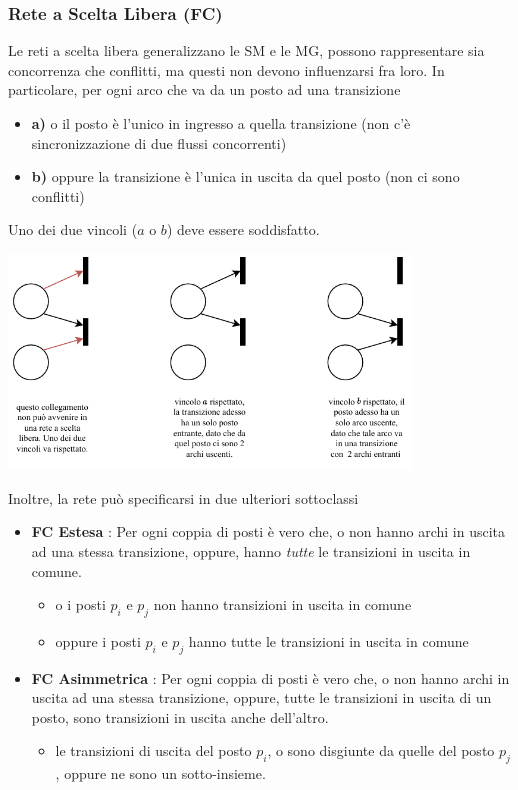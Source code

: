 \documentclass[10pt, letterpaper]{report}
\begin{document}
\subsubsection{Rete a Scelta Libera (FC)}
Le reti a scelta libera generalizzano le SM e le MG, possono rappresentare sia concorrenza che conflitti, ma questi non devono influenzarsi fra loro. In particolare, per ogni arco che va da un posto ad una transizione\begin{itemize}
    \item \textbf{a)} o il posto è l'unico in ingresso a quella transizione (non c'è sincronizzazione di due flussi concorrenti)
    \item \textbf{b)} oppure la transizione è l'unica in uscita da quel posto (non ci sono conflitti)
\end{itemize}
Uno dei due vincoli ($a$ o $b$) deve essere soddisfatto.
\begin{center}
    \includegraphics[width=0.8\textwidth]{images/FreeChoice.drawio.pdf}
\end{center}
Inoltre, la rete può specificarsi in due ulteriori sottoclassi\begin{itemize}
    \item \textbf{FC Estesa} : Per ogni coppia di posti è vero che, o non hanno archi in uscita ad una stessa transizione, oppure, hanno \textit{tutte} le transizioni in uscita in comune.\begin{itemize}
        \item o i posti $p_i$ e $p_j$ non hanno transizioni in uscita in comune 
        \item oppure i posti $p_i$ e $p_j$ hanno tutte le transizioni in uscita in comune 
    \end{itemize}
    \item \textbf{FC Asimmetrica} : Per ogni coppia di posti è vero che, o non hanno archi in uscita ad una stessa transizione, oppure, tutte le transizioni in uscita di un posto, sono transizioni in uscita anche dell'altro.\begin{itemize}
        \item le transizioni di uscita del posto $p_i$, o sono disgiunte da quelle del posto $p_j$, oppure ne sono un sotto-insieme.
    \end{itemize}
\end{itemize}
\end{document}
